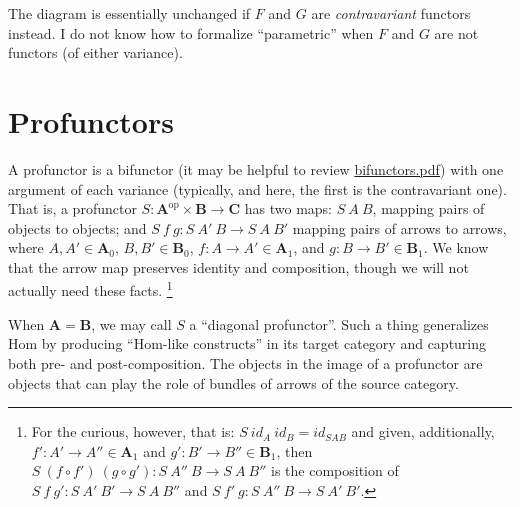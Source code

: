 \documentclass[letterpaper]{article}
\begin{document}
\begin{center}\end{center}

The diagram is essentially unchanged if $F$ and $G$ are {\em contravariant}
functors instead.  I do not know how to formalize ``parametric'' when $F$
and $G$ are not functors (of either variance).

\section{Profunctors}

A profunctor is a bifunctor (it may be helpful to review
\url{bifunctors.pdf}) with one argument of each variance (typically, and
here, the first is the contravariant one).  That is, a profunctor $S :
\mathbf{A}^{\text{op}} \times \mathbf{B} \to \mathbf{C}$ has two maps:
$S~A~B$, mapping pairs of objects to objects; and $S~f~g : S~A'~B \to
S~A~B'$ mapping pairs of arrows to arrows, where $A,A' \in \mathbf{A}_0$,
$B,B' \in \mathbf{B}_0$, $f : A \to A' \in \mathbf{A}_1$, and $g : B \to B'
\in \mathbf{B}_1$.  We know that the arrow map preserves identity and
composition, though we will not actually need these facts.%
%
\footnote{For the curious, however, that is: $S~id_A~id_B = id_{S A B}$ and
given, additionally, $f' : A' \to A'' \in \mathbf{A}_1$ and $g' : B' \to B''
\in \mathbf{B}_1$, then $S~(f \circ f')~(g \circ g') : S~A''~B \to S~A~B''$
is the composition of $S~f~g' : S~A'~B' \to S~A~B''$ and $S~f'~g : S~A''~B
\to S~A'~B'$.}

When $\mathbf{A} = \mathbf{B}$, we may call $S$ a ``diagonal profunctor''.
Such a thing generalizes $\text{Hom}$ by producing ``$\text{Hom}$-like
constructs'' in its target category and capturing both pre- and
post-composition.  The objects in the image of a profunctor are objects that
can play the role of bundles of arrows of the source category.
\end{document}
